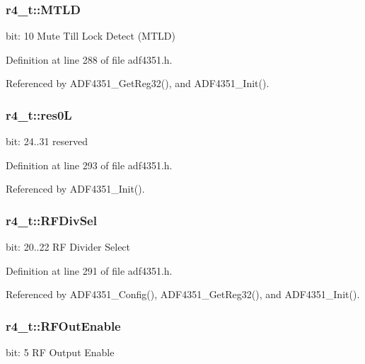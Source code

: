 \subsubsection[{\texorpdfstring{M\+T\+LD}{MTLD}}]{ r4\+\_\+t\+::\+M\+T\+LD}\hypertarget{structr4__t_a899217c98d1c1eca8780186c8e44470c}{}\label{structr4__t_a899217c98d1c1eca8780186c8e44470c}
bit\+: 10 Mute Till Lock Detect (M\+T\+LD) 

Definition at line 288 of file adf4351.\+h.



Referenced by A\+D\+F4351\+\_\+\+Get\+Reg32(), and A\+D\+F4351\+\_\+\+Init().

\subsubsection[{\texorpdfstring{res0L}{res0L}}]{ r4\+\_\+t\+::res0L}\hypertarget{structr4__t_a39447a9d51f096493dfc6d4a38bf3f9e}{}\label{structr4__t_a39447a9d51f096493dfc6d4a38bf3f9e}
bit\+: 24..31 reserved 

Definition at line 293 of file adf4351.\+h.



Referenced by A\+D\+F4351\+\_\+\+Init().

\subsubsection[{\texorpdfstring{R\+F\+Div\+Sel}{RFDivSel}}]{ r4\+\_\+t\+::\+R\+F\+Div\+Sel}\hypertarget{structr4__t_a6f0ef612a55877310aa2f07c9737e66b}{}\label{structr4__t_a6f0ef612a55877310aa2f07c9737e66b}
bit\+: 20..22 RF Divider Select 

Definition at line 291 of file adf4351.\+h.



Referenced by A\+D\+F4351\+\_\+\+Config(), A\+D\+F4351\+\_\+\+Get\+Reg32(), and A\+D\+F4351\+\_\+\+Init().

\subsubsection[{\texorpdfstring{R\+F\+Out\+Enable}{RFOutEnable}}]{ r4\+\_\+t\+::\+R\+F\+Out\+Enable}\hypertarget{structr4__t_adf8eb2db5ffd584ec6c5b5496a90f0f5}{}\label{structr4__t_adf8eb2db5ffd584ec6c5b5496a90f0f5}
bit\+: 5 RF Output Enable 

